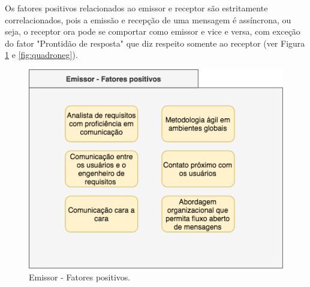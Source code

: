 Os fatores positivos relacionados ao emissor e receptor são estritamente correlacionados, pois a emissão e recepção de uma mensagem é assíncrona, ou seja, o receptor ora pode se comportar como emissor e vice e versa, com exceção do fator "Prontidão de resposta" que diz respeito somente ao receptor (ver Figura \ref{fig:quadro3} e \ref{fig:quadroneg}).


\begin{figure}[h!] %
\caption{Emissor - Fatores positivos.}
	\begin{center}
	    \includegraphics[scale=0.6]{figuras/quadro3} %
	\end{center}
	\label{fig:quadro3}
\end{figure}

\newpage


